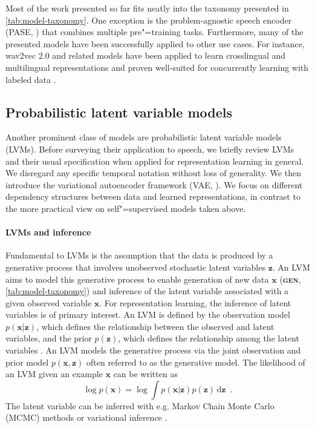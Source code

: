 {Most of the work presented so far fits neatly into the taxonomy presented in \cref{tab:model-taxonomy}. One exception is the problem-agnostic speech encoder (PASE, \citealp{pascual_learning_2019, ravanelli_multitask_2020}) that combines multiple pre"=training tasks. Furthermore, many of the presented models have been successfully applied to other use cases. For instance, wav2vec 2.0 and related models have been applied to learn crosslingual and multilingual representations \parencite{riviere_unsupervised_2020, conneau_unsupervised_2020, khurana_magic_2021} and proven well-suited for concurrently learning with labeled data \parencite{talnikar_joint_2021, wang_unispeech_2021}. %


\subsection{Probabilistic latent variable models}
\label{sec:plvms}
Another prominent class of models are probabilistic latent variable models (LVMs). 
Before surveying their application to speech, we briefly review LVMs and their usual specification when applied for representation learning in general. We disregard any specific temporal notation without loss of generality. 
We then introduce the variational autoencoder framework (VAE, \citealp{kingma_autoencoding_2014}). We focus on different dependency structures between data and learned representations, in contrast to the more practical view on self"=supervised models taken above.

\paragraph{LVMs and inference}
Fundamental to LVMs is the assumption that the data is produced by a generative process that involves unobserved stochastic latent variables $\textbf{z}$. 
An LVM aims to model this generative process to enable generation of new data $\mathbf{x}$ (\textbf{\textsc{gen}}, \cref{tab:model-taxonomy}) and inference of the latent variable associated with a given observed variable $\textbf{x}$. 
For representation learning, the inference of latent variables is of primary interest.
An LVM is defined by the observation model $p(\mathbf{x}|\mathbf{z})$, which defines the relationship between the observed and latent variables, and the prior $p(\mathbf{z})$, which defines the relationship among the latent variables \parencite{bartholomew_latent_2011}. 
An LVM models the generative process via the joint observation and prior model $p(\mathbf{x}, \mathbf{z})$ often referred to as the generative model. 
The likelihood of an LVM given an example $\textbf{x}$ can be written as
\begin{equation}
    \log p(\mathbf{x}) = \log \int p(\mathbf{x}|\mathbf{z}) p(\mathbf{z}) \,\text{d}\mathbf{z} \enspace.
    \label{eq_brief: lvm log-likelihood}
\end{equation}
The latent variable can be inferred with e.g. Markov Chain Monte Carlo (MCMC) methods \parencite{mohamed_monte_2019} or variational inference \parencite{jordan_introduction_1999}.

}
